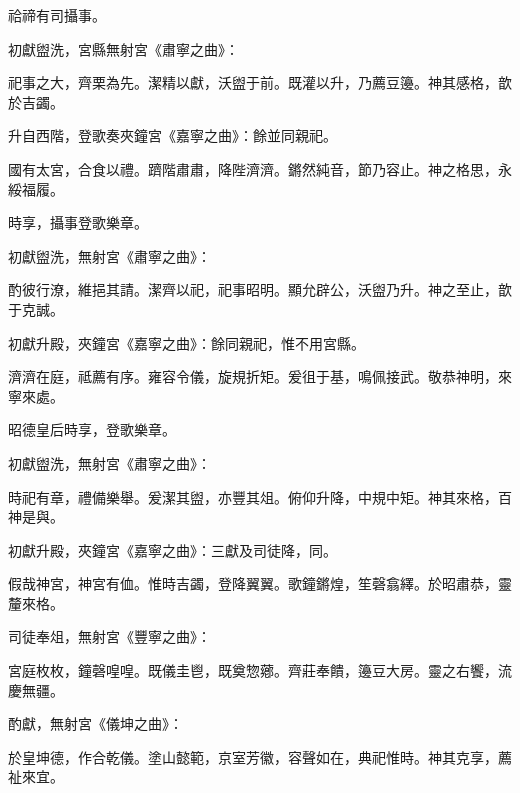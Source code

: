 \begin{pinyinscope}
 祫禘有司攝事。



 初獻盥洗，宮縣無射宮《肅寧之曲》：



 祀事之大，齊栗為先。潔精以獻，沃盥于前。既灌以升，乃薦豆籩。神其感格，歆於吉蠲。



 升自西階，登歌奏夾鐘宮《嘉寧之曲》：餘並同親祀。



 國有太宮，合食以禮。躋階肅肅，降陛濟濟。鏘然純音，節乃容止。神之格思，永綏福履。



 時享，攝事登歌樂章。



 初獻盥洗，無射宮《肅寧之曲》：



 酌彼行潦，維挹其請。潔齊以祀，祀事昭明。顯允辟公，沃盥乃升。神之至止，歆于克誠。



 初獻升殿，夾鐘宮《嘉寧之曲》：餘同親祀，惟不用宮縣。



 濟濟在庭，祗薦有序。雍容令儀，旋規折矩。爰徂于基，鳴佩接武。敬恭神明，來寧來處。



 昭德皇后時享，登歌樂章。



 初獻盥洗，無射宮《肅寧之曲》：



 時祀有章，禮備樂舉。爰潔其盥，亦豐其俎。俯仰升降，中規中矩。神其來格，百神是與。



 初獻升殿，夾鐘宮《嘉寧之曲》：三獻及司徒降，同。



 假哉神宮，神宮有侐。惟時吉蠲，登降翼翼。歌鐘鏘煌，笙磬翕繹。於昭肅恭，靈釐來格。



 司徒奉俎，無射宮《豐寧之曲》：



 宮庭枚枚，鐘磬喤喤。既儀圭鬯，既奠惣薌。齊莊奉饋，籩豆大房。靈之右饗，流慶無疆。



 酌獻，無射宮《儀坤之曲》：



 於皇坤德，作合乾儀。塗山懿範，京室芳徽，容聲如在，典祀惟時。神其克享，薦祉來宜。




\end{pinyinscope}
